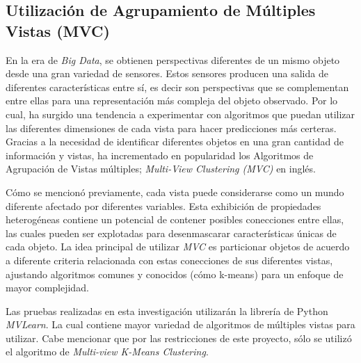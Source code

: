 \documentclass[letterpaper, 10 pt, conference]{ieeeconf}  %
\begin{document}
    \subsection{Utilización de Agrupamiento de Múltiples Vistas (MVC)}
    En la era de \textit{Big Data}, se obtienen perspectivas diferentes de un mismo objeto desde
    una gran variedad de sensores. Estos sensores producen una salida de diferentes características
    entre sí, es decir son perspectivas que se complementan entre ellas para una representación
    más compleja del objeto observado. Por lo cual, ha surgido una tendencia a experimentar con
    algoritmos que puedan utilizar las diferentes dimensiones de cada vista para hacer predicciones
    más certeras.  Gracias a la necesidad de identificar diferentes objetos en una gran cantidad de
    información y vistas, ha incrementado en popularidad los Algoritmos de Agrupación de Vistas
    múltiples; \textit{Multi-View Clustering (MVC)} en inglés.

    Cómo se mencionó previamente, cada vista puede considerarse como un mundo diferente afectado
    por diferentes variables. Esta exhibición de propiedades heterogéneas contiene un potencial de
    contener posibles conecciones entre ellas, las cuales pueden ser explotadas para desenmascarar
    características únicas de cada objeto. La idea principal de utilizar \textit{MVC} es
    particionar objetos de acuerdo a diferente criteria relacionada con estas conecciones de sus
    diferentes vistas, ajustando algoritmos comunes y conocidos (cómo k-means) para un enfoque de
    mayor complejidad. \cite{Yang2018}

    Las pruebas realizadas en esta investigación utilizarán la librería de Python \textit{MVLearn}.
    \cite{MVlearn} La cual contiene mayor variedad de algoritmos de múltiples vistas para utilizar.
    Cabe mencionar que por las restricciones de este proyecto, sólo se utilizó el algoritmo de
    \textit{Multi-view K-Means Clustering}.

\end{document}
